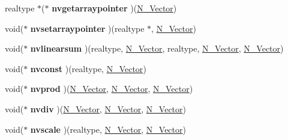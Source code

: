 \begin{DoxyCompactItemize}
realtype $\ast$($\ast$ {\bfseries nvgetarraypointer} )(\mbox{\hyperlink{struct__generic__N__Vector}{N\+\_\+\+Vector}})
\item 
\mbox{\label{struct__generic__N__Vector__Ops_aa97dd75674985b0821b70490d78070c8}} 
void($\ast$ {\bfseries nvsetarraypointer} )(realtype $\ast$, \mbox{\hyperlink{struct__generic__N__Vector}{N\+\_\+\+Vector}})
\item 
\mbox{\label{struct__generic__N__Vector__Ops_a112008b055087d045e3d0f016b87c93c}} 
void($\ast$ {\bfseries nvlinearsum} )(realtype, \mbox{\hyperlink{struct__generic__N__Vector}{N\+\_\+\+Vector}}, realtype, \mbox{\hyperlink{struct__generic__N__Vector}{N\+\_\+\+Vector}}, \mbox{\hyperlink{struct__generic__N__Vector}{N\+\_\+\+Vector}})
\item 
\mbox{\label{struct__generic__N__Vector__Ops_aa99726467ea6bdb0e3dce28ee64f5396}} 
void($\ast$ {\bfseries nvconst} )(realtype, \mbox{\hyperlink{struct__generic__N__Vector}{N\+\_\+\+Vector}})
\item 
\mbox{\label{struct__generic__N__Vector__Ops_a26c438966b968eaf8f7c9774a1d10f42}} 
void($\ast$ {\bfseries nvprod} )(\mbox{\hyperlink{struct__generic__N__Vector}{N\+\_\+\+Vector}}, \mbox{\hyperlink{struct__generic__N__Vector}{N\+\_\+\+Vector}}, \mbox{\hyperlink{struct__generic__N__Vector}{N\+\_\+\+Vector}})
\item 
\mbox{\label{struct__generic__N__Vector__Ops_ab12b281b45793518f2cfa4138229612b}} 
void($\ast$ {\bfseries nvdiv} )(\mbox{\hyperlink{struct__generic__N__Vector}{N\+\_\+\+Vector}}, \mbox{\hyperlink{struct__generic__N__Vector}{N\+\_\+\+Vector}}, \mbox{\hyperlink{struct__generic__N__Vector}{N\+\_\+\+Vector}})
\item 
\mbox{\label{struct__generic__N__Vector__Ops_a67c3306de294f2d95c137ed94a97d8e9}} 
void($\ast$ {\bfseries nvscale} )(realtype, \mbox{\hyperlink{struct__generic__N__Vector}{N\+\_\+\+Vector}}, \mbox{\hyperlink{struct__generic__N__Vector}{N\+\_\+\+Vector}})
\item 
\mbox{\label{struct__generic__N__Vector__Ops_a89c86a656284660caad8c12967df27e7}} 

\end{DoxyCompactItemize}
